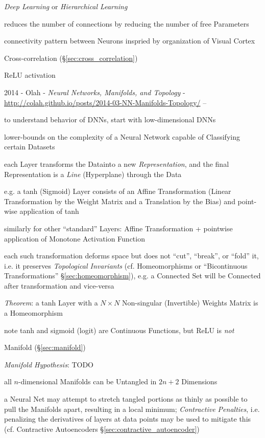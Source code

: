 \emph{Deep Learning} or \emph{Hierarchical Learning}

reduces the number of connections by reducing the number of free Parameters

connectivity pattern between Neurons inspried by organization of Visual Cortex

Cross-correlation (\S\ref{sec:cross_correlation})

ReLU activation

\asterism

2014 - Olah - \emph{Neural Networks, Manifolds, and Topology} -
\url{http://colah.github.io/posts/2014-03-NN-Manifolds-Topology/} --

to understand behavior of DNNs, start with low-dimensional DNNs

lower-bounds on the complexity of a Neural Network capable of Classifying
certain Datasets

each Layer transforms the Datainto a new \emph{Representation}, and the
final Representation is a \emph{Line} (Hyperplane) through the Data

e.g. a tanh (Sigmoid) Layer consists of an Affine Transformation (Linear
Transformation by the Weight Matrix and a Translation by the Bias) and
point-wise application of tanh

similarly for other ``standard'' Layers: Affine Transformation + pointwise
application of Monotone Activation Function

each such transformation deforms space but does not ``cut'', ``break'', or
``fold'' it, i.e. it preserves \emph{Topological Invariants} (cf. Homeomorphisms
or ``Bicontinuous Transformations'' \S\ref{sec:homeomorphism}), e.g. a Connected
Set will be Connected after transformation and vice-versa

\emph{Theorem}: a tanh Layer with a $N \times N$ Non-singular (Invertible)
Weights Matrix is a Homeomorphism

note tanh and sigmoid (logit) are Continuous Functions, but ReLU is \emph{not}

Manifold (\S\ref{sec:manifold})

\emph{Manifold Hypothesis}: TODO

all $n$-dimensional Manifolds can be Untangled in $2n + 2$ Dimensions

a Neural Net may attempt to stretch tangled portions as thinly as possible to
pull the Manifolds apart, resulting in a local minimum; \emph{Contractive
  Penalties}, i.e. penalizing the derivatives of layers at data points may be
used to mitigate this (cf. Contractive Autoencoders
\S\ref{sec:contractive_autoencoder})

